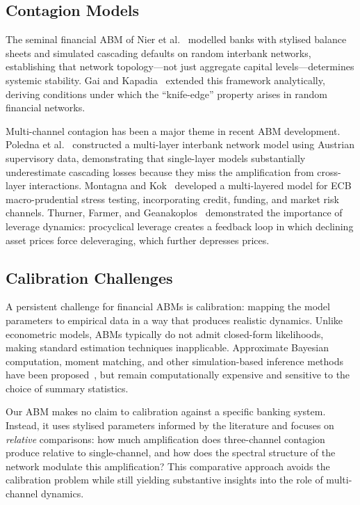 \subsection{Contagion Models}
\label{sec:abm_contagion}

The seminal financial ABM of Nier et al.~\cite{nier2007network} modelled
banks with stylised balance sheets and simulated cascading defaults on
random interbank networks, establishing that network topology---not just
aggregate capital levels---determines systemic stability.  Gai and
Kapadia~\cite{gai2010contagion} extended this framework analytically,
deriving conditions under which the ``knife-edge'' property arises in
random financial networks.

Multi-channel contagion has been a major theme in recent ABM development.
Poledna et al.~\cite{poledna2015economics} constructed a multi-layer
interbank network model using Austrian supervisory data, demonstrating
that single-layer models substantially underestimate cascading losses
because they miss the amplification from cross-layer interactions.
Montagna and Kok~\cite{montagna2016multi} developed a multi-layered
model for ECB macro-prudential stress testing, incorporating credit,
funding, and market risk channels.  Thurner, Farmer, and
Geanakoplos~\cite{thurner2012leverage} demonstrated the importance of
leverage dynamics: procyclical leverage creates a feedback loop in which
declining asset prices force deleveraging, which further depresses prices.

\subsection{Calibration Challenges}
\label{sec:abm_calibration}

A persistent challenge for financial ABMs is calibration: mapping the
model parameters to empirical data in a way that produces realistic
dynamics.  Unlike econometric models, ABMs typically do not admit
closed-form likelihoods, making standard estimation techniques
inapplicable.  Approximate Bayesian computation, moment matching, and
other simulation-based inference methods have been
proposed~\cite{farmer2009economy}, but remain computationally expensive
and sensitive to the choice of summary statistics.

Our ABM makes no claim to calibration against a specific banking system.
Instead, it uses stylised parameters informed by the literature and
focuses on \emph{relative} comparisons: how much amplification does
three-channel contagion produce relative to single-channel, and how does
the spectral structure of the network modulate this amplification?  This
comparative approach avoids the calibration problem while still yielding
substantive insights into the role of multi-channel dynamics.


